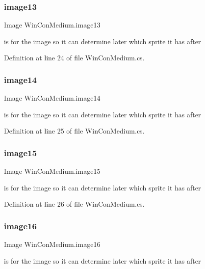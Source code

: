 \subsubsection{\texorpdfstring{image13}{image13}}
{\footnotesize\ttfamily Image Win\+Con\+Medium.\+image13}

is for the image so it can determine later which sprite it has after 

Definition at line 24 of file Win\+Con\+Medium.\+cs.

\mbox{\label{class_win_con_medium_a19a0aa17d0d7f22bd0e72242a095a411}} 
\subsubsection{\texorpdfstring{image14}{image14}}
{\footnotesize\ttfamily Image Win\+Con\+Medium.\+image14}

is for the image so it can determine later which sprite it has after 

Definition at line 25 of file Win\+Con\+Medium.\+cs.

\mbox{\label{class_win_con_medium_a6890efc7c7db76a6b2680d44bd96c49c}} 
\subsubsection{\texorpdfstring{image15}{image15}}
{\footnotesize\ttfamily Image Win\+Con\+Medium.\+image15}

is for the image so it can determine later which sprite it has after 

Definition at line 26 of file Win\+Con\+Medium.\+cs.

\mbox{\label{class_win_con_medium_ac328a350555467840a6f0e9b324fe4e9}} 
\subsubsection{\texorpdfstring{image16}{image16}}
{\footnotesize\ttfamily Image Win\+Con\+Medium.\+image16}

is for the image so it can determine later which sprite it has after 

